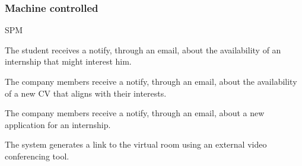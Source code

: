 \subsubsection*{Machine controlled}
\begin{listInSquareBrackets}{SPM}
    \item The student receives a notify, through an email, about the availability of an internship that might interest him.
    \item The company members receive a notify, through an email, about the availability of a new CV that aligns with their interests.
    \item The company members receive a notify, through an email, about a new application for an internship.
    \item The system generates a link to the virtual room using an external video conferencing tool.
\end{listInSquareBrackets}

